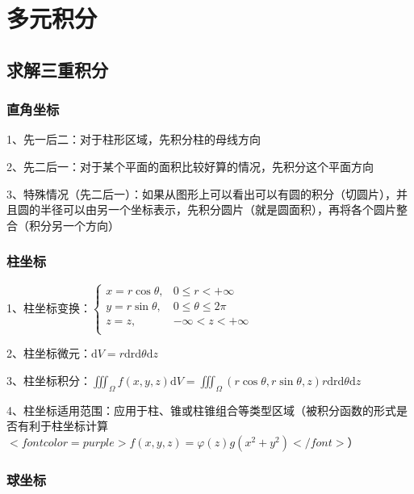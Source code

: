 \chapter{多元积分}

\section{求解三重积分}



\subsection{直角坐标}

1、先一后二：对于柱形区域，先积分柱的母线方向

2、先二后一：对于某个平面的面积比较好算的情况，先积分这个平面方向

3、特殊情况（先二后一）：如果从图形上可以看出可以有圆的积分（切圆片），并且圆的半径可以由另一个坐标表示，先积分圆片（就是圆面积），再将各个圆片整合（积分另一个方向）



\subsection{柱坐标}

1、柱坐标变换：$ \begin{cases} x=r \cos \theta, & 0 \leqslant r < +\infty \\ y=r \sin \theta,& 0 \leqslant \theta \leqslant 2 \pi \\ z=z, &  -\infty<z<+\infty \\ \end{cases} $

2、柱坐标微元：$ \mathrm{d} V=r \mathrm{drd} \theta \mathrm{d} z $

3、柱坐标积分：$ \iiint_{\Omega} f(x, y, z) \mathrm{d} V=\iiint_{\Omega}(r \cos \theta, r \sin \theta, z) r \mathrm{drd} \theta \mathrm{d} z $

4、柱坐标适用范围：应用于柱、锥或柱锥组合等类型区域（被积分函数的形式是否有利于柱坐标计算$ <font color=purple>f(x, y, z)=\varphi(z) g\left(x^{2}+y^{2}\right)</font> $）



\subsection{球坐标}

